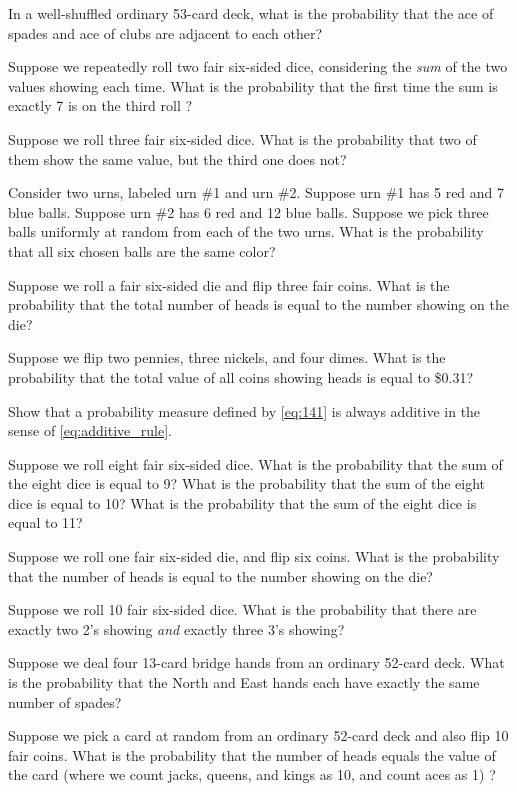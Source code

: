 \begin{exercises}
    \item In a well-shuffled ordinary 53-card deck, what is the probability that the ace of spades and ace of clubs are adjacent to each other?
    \item Suppose we repeatedly roll two fair six-sided dice, considering the \emph{sum} of the two values showing each time. What is the probability that the first time the sum is exactly 7 is on the third roll ?
    \item Suppose we roll three fair six-sided dice. What is the probability that two of them show the same value, but the third one does not?
    \item Consider two urns, labeled urn \#1 and urn \#2. Suppose urn \#1 has 5 red and  7 blue balls. Suppose urn \#2 has 6 red and 12 blue balls. Suppose we pick three balls uniformly at random from each of the two urns. What is the probability that all six chosen balls are the same color?
    \item Suppose we roll a fair six-sided die and flip three fair coins. What is the probability that the total number of heads is equal to the number showing on the die?
    \item Suppose we flip two pennies, three nickels, and four dimes. What is the probability that the total value of all coins showing heads is equal to \$0.31?
\end{exercises}

\begin{problems}
    \item Show that a probability measure defined by \autoref{eq:141} is always additive in the sense of \autoref{eq:additive_rule}.
    \item Suppose we roll eight fair six-sided dice. What is the probability that the sum of the eight dice is equal to 9? What is the probability that the sum of the eight dice is equal to 10? What is the probability that the sum of the eight dice is equal to 11?
    \item Suppose we roll one fair six-sided die, and flip six coins. What is the probability that the number of heads is equal to the number showing on the die?
    \item Suppose we roll 10 fair six-sided dice. What is the probability that there are exactly two 2's showing \emph{and} exactly three 3's showing?
    \item Suppose we deal four 13-card bridge hands from an ordinary 52-card deck. What is the probability that the North and East hands each have exactly the same number of spades?
    \item Suppose we pick a card at random from an ordinary 52-card deck and also flip 10 fair coins. What is the probability that the number of heads equals the value of the card (where we count jacks, queens, and kings as 10, and count aces as 1) ?
\end{problems}

